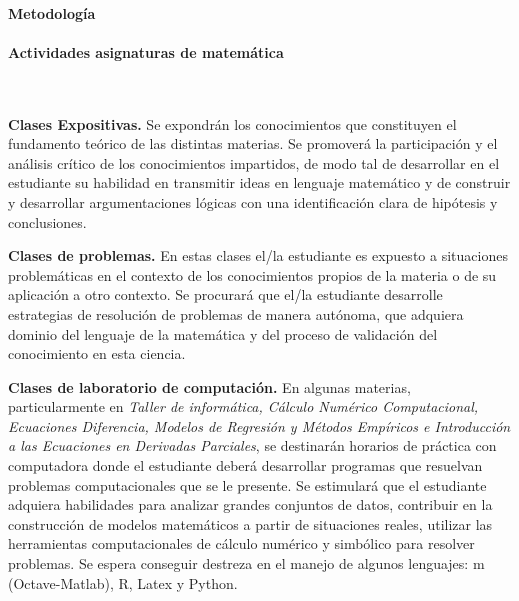 \documentclass[a4paper, 12pt]{article}
\begin{document}
\paragraph{Metodología}


\paragraph{Actividades asignaturas de matemática}\mbox{}\\

 

\begin{description}

\item{ \textbf{Clases Expositivas.}} Se expondrán los conocimientos  que constituyen el   
fundamento teórico de las distintas materias. Se promoverá la participación  y el análisis crítico de los conocimientos impartidos, de modo tal de desarrollar en el estudiante su habilidad en transmitir ideas en lenguaje matemático y de construir y desarrollar argumentaciones lógicas con una identificación clara
de hipótesis y conclusiones.



\item{\textbf{Clases de problemas.}} En estas clases el/la estudiante es expuesto a situaciones problemáticas en el contexto de los conocimientos propios de la   materia o de su aplicación a otro   contexto. Se procurará que el/la estudiante desarrolle estrategias de resolución de  problemas de manera autónoma, que adquiera dominio del lenguaje de la matemática y del proceso de validación del conocimiento en esta ciencia. 

\item{\textbf{Clases de laboratorio de computación.}} En algunas materias, particularmente en  \emph{ Taller de informática, Cálculo
 Numérico Computacional, Ecuaciones Diferencia,   Modelos de Regresión y Métodos Empíricos e Introducción a las Ecuaciones en Derivadas
Parciales}, se destinarán horarios de práctica con computadora donde el estudiante deberá desarrollar programas que resuelvan problemas computacionales que se le presente. Se estimulará que el estudiante adquiera habilidades para analizar grandes conjuntos de datos, contribuir en la construcción de modelos matemáticos a partir de situaciones reales, utilizar las herramientas computacionales de cálculo numérico y simbólico para resolver problemas. Se espera conseguir destreza en el manejo de algunos lenguajes: m (Octave-Matlab), R, Latex y Python. 


\end{description}
\end{document}
